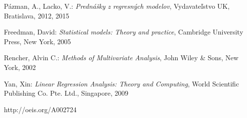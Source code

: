 \begin{thebibliography}{99}

	 Pázman, A., Lacko, V.: {\it Prednášky z regresných modelov}, Vydavateľstvo UK, Bratislava, 2012, 2015

	 Freedman, David: {\it Statistical models: Theory and practice}, Cambridge University Press, New York, 2005

	 Rencher, Alvin C.: {\it Methods of Multivariate Analysis}, John Wiley \& Sons, New York, 2002

	 Yan, Xin: {\it Linear Regression Analysis: Theory and Computing}, World Scientific Publishing Co. Pte. Ltd., Singapore, 2009

	 http://oeis.org/A002724

\end{thebibliography}
